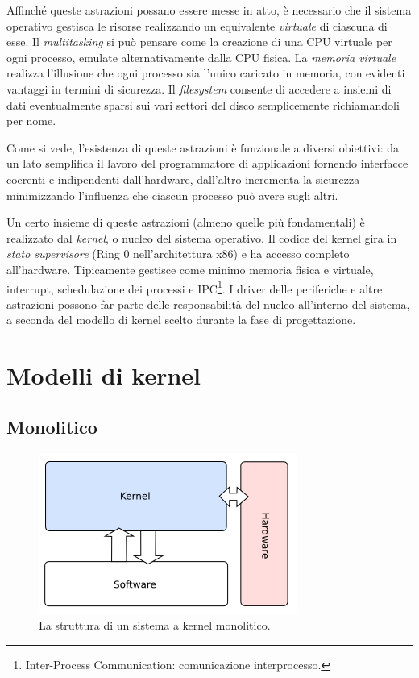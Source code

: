 \documentclass[12pt,a4paper]{report}
\begin{document}
		Affinché queste astrazioni possano essere messe in atto, è necessario che il sistema operativo
		gestisca le risorse realizzando un equivalente \emph{virtuale} di ciascuna di esse.
		Il \emph{multitasking} si può pensare come la creazione di una CPU virtuale per ogni processo, emulate
		alternativamente dalla CPU fisica.
		La \emph{memoria virtuale} realizza l'illusione che ogni processo sia l'unico caricato in memoria, con
		evidenti vantaggi in termini di sicurezza.
		Il \emph{filesystem} consente di accedere a insiemi di dati eventualmente sparsi sui vari settori
		del disco semplicemente richiamandoli per nome.
		
		Come si vede, l'esistenza di queste astrazioni è funzionale a diversi obiettivi: da un lato semplifica
		il lavoro del programmatore di applicazioni fornendo interfacce coerenti e indipendenti dall'hardware,
		dall'altro incrementa la sicurezza minimizzando l'influenza che ciascun processo può avere sugli altri.
		
		Un certo insieme di queste astrazioni (almeno quelle più fondamentali) è realizzato dal \emph{kernel},
		o nucleo del sistema operativo.
		Il codice del kernel gira in \emph{stato supervisore} (Ring 0 nell'architettura x86) e ha accesso completo
		all'hardware. Tipicamente gestisce come minimo memoria fisica e virtuale, interrupt, schedulazione dei processi e
		IPC\footnote{Inter-Process Communication: comunicazione interprocesso.}. 
		I driver delle periferiche e altre astrazioni possono far parte delle responsabilità del nucleo all'interno del sistema,
		a seconda del modello di kernel scelto durante la fase di progettazione.
	
	\section{Modelli di kernel}
		\subsection{Monolitico}
			\begin{figure}[htbp]
			\centering
			\includegraphics[scale=0.7]{img/monolithic.png}
			\caption{La struttura di un sistema a kernel monolitico. \cite{OSDEV_Monolithic}\label{fig:monolithic}}
			\end{figure}
		
\end{document}
